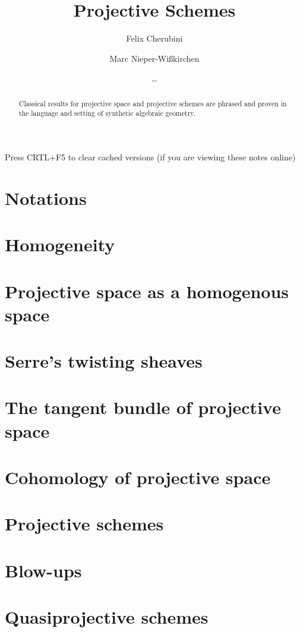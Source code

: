 \documentclass{../util/zariski}
\title{Projective Schemes}
\author{Felix Cherubini \and Marc Nieper-Wi\ss{}kirchen \and \dots}
\begin{document}
\maketitle

\begin{center}
  \color{purple}
  \large{Press CRTL+F5 to clear cached versions}
  \large{(if you are viewing these notes online)}
\end{center}

\begin{abstract}
  Classical results for projective space and projective schemes are
  phrased and proven in the language and setting of synthetic
  algebraic geometry.
\end{abstract}

\tableofcontents

\section{Notations}


\section{Homogeneity}


\section{Projective space as a homogenous space}


\section{Serre's twisting sheaves}

\section{The tangent bundle of projective space}

\section{Cohomology of projective space}

\section{Projective schemes}

\section{Blow-ups}

\section{Quasiprojective schemes}

\printindex

\printbibliography
\end{document}
